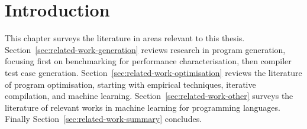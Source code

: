 \section{Introduction}

This chapter surveys the literature in areas relevant to this thesis. Section~\ref{sec:related-work-generation} reviews research in program generation, focusing first on benchmarking for performance characterisation, then compiler test case generation. Section~\ref{sec:related-work-optimisation} reviews the literature of program optimisation, starting with empirical techniques, iterative compilation, and machine learning. Section~\ref{sec:related-work-other} surveys the literature of relevant works in machine learning for programming languages. Finally Section~\ref{sec:related-work-summary} concludes.
